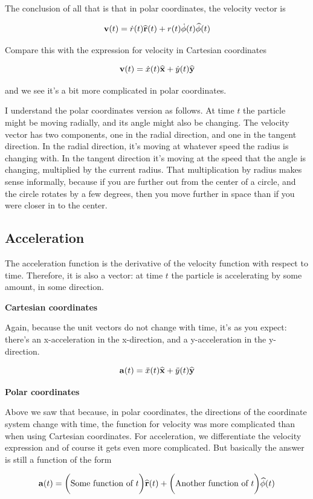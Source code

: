 The conclusion of all that is that in polar coordinates, the velocity vector is

$$\mathbf v(t) = \dot r(t) \mathbf{\widehat{r}}(t) + r(t) \dot \phi(t) \mathbf{\widehat{\phi}}(t)$$

Compare this with the expression for velocity in Cartesian coordinates

$$\mathbf v(t) =  \dot x(t) \mathbf{\widehat{x}} + \dot y(t) \mathbf{\widehat{y}}$$

and we see it's a bit more complicated in polar coordinates.

I understand the polar coordinates version as follows. At time $t$ the particle
might be moving radially, and its angle might also be changing. The velocity
vector has two components, one in the radial direction, and one in the tangent
direction. In the radial direction, it's moving at whatever speed the radius is
changing with. In the tangent direction it's moving at the speed that the angle
is changing, multiplied by the current radius. That multiplication by radius
makes sense informally, because if you are further out from the center of a
circle, and the circle rotates by a few degrees, then you move further in space
than if you were closer in to the center.


\subsection{Acceleration}


The acceleration function is the derivative of the velocity function with
respect to time. Therefore, it is also a vector: at time $t$ the particle is
accelerating by some amount, in some direction.

\textbf{Cartesian coordinates}

Again, because the unit vectors do not change with time, it's as you expect:
there's an x-acceleration in the x-direction, and a y-acceleration in the
y-direction.

$$\mathbf{a}(t) = \ddot x(t) \mathbf{\widehat{x}} + \ddot y(t) \mathbf{\widehat{y}}$$

\textbf{Polar coordinates}

Above we saw that because, in polar coordinates, the directions of the
coordinate system change with time, the function for velocity was more
complicated than when using Cartesian coordinates. For acceleration, we
differentiate the velocity expression and of course it gets even more
complicated. But basically the answer is still a function of the form

$$\mathbf{a}(t) = \bigg( \text{Some function of } t \bigg) \mathbf{\widehat{r}}(t) + \bigg( \text{Another function of } t \bigg) \mathbf{\widehat{\phi}}(t)$$

